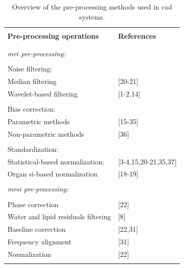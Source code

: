 \begin{table}
	\caption{Overview of the pre-processing methods used in \ac{cad} systems.}
	\small
	\begin{tabular}{p{.65\linewidth} p{.25\linewidth}}
		\hline \\ [-1.5ex]
		\textbf{Pre-processing operations} & \textbf{References} \\ \\ [-1.5ex]
		\hline \\ [-1.5ex]
		\textit{\ac{mri} pre-processing:} & \\ \\ [-1.5ex]
		\quad Noise filtering: &  \\
		\quad \quad Median filtering & $[$20-21$]$  \\
		\quad \quad Wavelet-based filtering & $[$1-2,14$]$ \\ \\ [-1.5ex]
		\quad Bias correction: & \\
		\quad \quad Parametric methods & $[$15-35$]$ \\
		\quad \quad Non-parametric methods & $[$36$]$ \\ \\ [-1.5ex]
		\quad Standardization: & \\
		\quad \quad Statistical-based normalization: & $[$3-4,15,20-21,35,37$]$ \\
		\quad \quad Organ \ac{si}-based normalization & $[$18-19$]$ \\ \\ [-1.5ex]
		\textit{\ac{mrsi} pre-processing:} & \\ \\ [-1.5ex]
		\quad Phase correction & $[$22$]$ \\
		\quad Water and lipid residuals filtering & $[$8$]$ \\
		\quad Baseline correction & $[$22,31$]$ \\
		\quad Frequency alignment & $[$31$]$ \\
		\quad Normalization & $[$22$]$ \\ \\ [-1.5ex]
		\hline
	\end{tabular}
\label{tab:summary-preproc}
\end{table}
